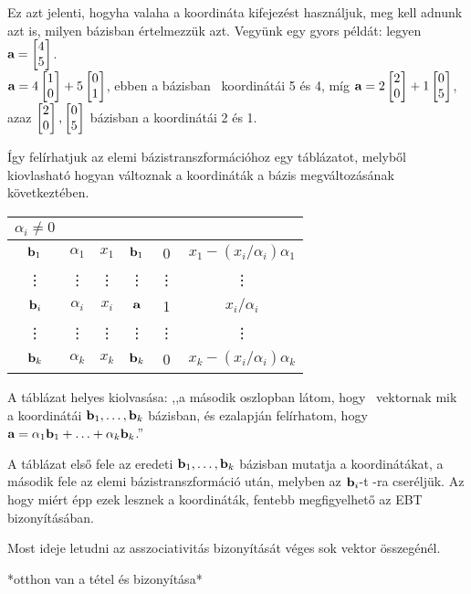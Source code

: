 \documentclass[a4paper,11.5pt]{article}
\begin{document}
	Ez azt jelenti, hogyha valaha a koordináta kifejezést használjuk, meg kell adnunk azt is, milyen bázisban értelmezzük azt. Vegyünk egy gyors példát: legyen $\a=
		\begin{bmatrix}
			4\s\\
			5\s
		\end{bmatrix}$.\\
		$\a=4
		\begin{bmatrix}
			1\s\\
			0\s
		\end{bmatrix}+5
		\begin{bmatrix}
			0\s\\
			1\s
		\end{bmatrix}$, ebben a bázisban \a\ koordinátái 5 és 4, míg
	$\a=2
	\begin{bmatrix}
		2\s\\
		0\s
	\end{bmatrix}+1
	\begin{bmatrix}
		0\s\\
		5\s
	\end{bmatrix}$,
	   azaz
	$\begin{bmatrix}
		2\s\\
		0\s
	\end{bmatrix},
	\begin{bmatrix}
		0\s\\
		5\s
	\end{bmatrix}$
	   bázisban a koordinátái 2 és 1.
	
	Így felírhatjuk az elemi bázistranszformációhoz egy táblázatot, melyből kiovlasható hogyan változnak a koordináták a bázis megváltozásának következtében.
	
	\begin{center}
		\begin{tabular}{c|cc||c|cc}
			$\alpha_i\not=0$&\a&\x&&\a&\x\\
			\hline
			$\textbf{b}_1$&$\alpha_1$&$x_1$&$\textbf{b}_1$&0&$x_1-(x_i/\alpha_i)\alpha_1$\\
			\vdots&\vdots&\vdots&\vdots&\vdots&\vdots\\
			$\textbf{b}_i$&$\alpha_i$&$x_i$&$\textbf{a}$&1&$x_i/\alpha_i$\\
			\vdots&\vdots&\vdots&\vdots&\vdots&\vdots\\
			$\textbf{b}_k$&$\alpha_k$&$x_k$&$\textbf{b}_k$&0&$x_k-(x_i/\alpha_i)\alpha_k$\\
		\end{tabular}
	\end{center}
	
	   A táblázat helyes kiolvasása: ,,a második oszlopban látom, hogy \a\  vektornak mik a koordinátái $\textbf{b}_1,\ldots,\textbf{b}_k$ bázisban, és ezalapján felírhatom, hogy $\textbf{a} = \alpha_1\textbf{b}_1+\ldots+\alpha_k\textbf{b}_k$.''
	
	   A táblázat első fele az eredeti $\textbf{b}_1,\ldots,\textbf{b}_k$ bázisban mutatja a koordinátákat, a második fele az elemi bázistranszformáció után, melyben az $\textbf{b}_i$-t \a-ra cseréljük. Az hogy miért épp ezek lesznek a koordináták, fentebb megfigyelhető az EBT bizonyításában.
	
	Most ideje letudni az asszociativitás bizonyítását véges sok vektor összegénél.
	
	*otthon van a tétel és bizonyítása*
	
	
	
\end{document}
